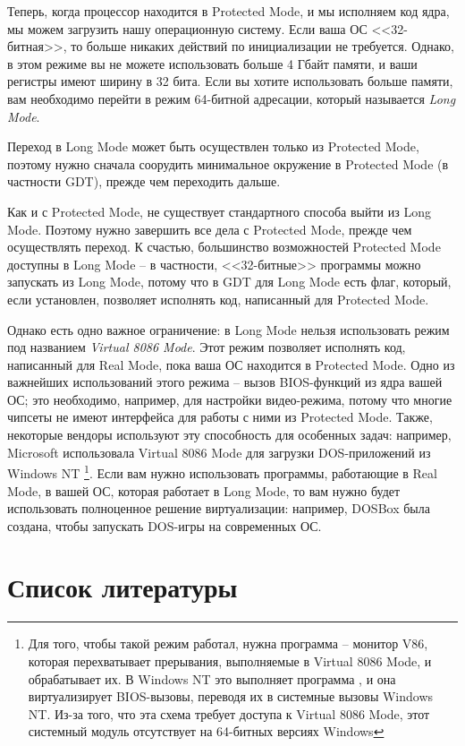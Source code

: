 \documentclass[a4page]{article}
\begin{document}
Теперь, когда процессор находится в Protected Mode,
и мы исполняем код ядра,
мы можем загрузить нашу операционную систему.
Если ваша ОС <<32-битная>>, то больше никаких действий по инициализации не требуется.
Однако, в этом режиме вы не можете использовать больше 4 Гбайт памяти,
и ваши регистры имеют ширину в 32 бита.
Если вы хотите использовать больше памяти,
вам необходимо перейти в режим 64-битной адресации, который называется \emph{Long Mode}.

Переход в Long Mode может быть осуществлен только из Protected Mode,
поэтому нужно сначала соорудить минимальное окружение в Protected Mode
(в частности GDT), прежде чем переходить дальше.

Как и с Protected Mode, не существует стандартного способа выйти из Long Mode.
Поэтому нужно завершить все дела с Protected Mode, прежде чем осуществлять переход.
К счастью, большинство возможностей Protected Mode доступны в Long Mode -- 
в частности, <<32-битные>> программы можно запускать из Long Mode,
потому что в GDT для Long Mode есть флаг, который, если установлен,
позволяет исполнять код, написанный для Protected Mode.

Однако есть одно важное ограничение: в Long Mode нельзя использовать
режим под названием \emph{Virtual 8086 Mode}.
Этот режим позволяет исполнять код, написанный для Real Mode,
пока ваша ОС находится в Protected Mode.
Одно из важнейших использований этого режима -- вызов BIOS-функций из ядра вашей ОС;
это необходимо, например, для настройки видео-режима,
потому что многие чипсеты не имеют интерфейса для работы с ними из Protected Mode.
Также, некоторые вендоры используют эту способность для особенных задач:
например, Microsoft использовала Virtual 8086 Mode для загрузки DOS-приложений
из Windows NT
\footnote{Для того, чтобы такой режим работал, нужна программа -- монитор V86,
которая перехватывает прерывания, выполняемые в Virtual 8086 Mode,
и обрабатывает их.
В Windows NT это выполняет программа ,
и она виртуализирует BIOS-вызовы, переводя их в системные вызовы Windows NT.
Из-за того, что эта схема требует доступа к Virtual 8086 Mode,
этот системный модуль отсутствует на 64-битных версиях Windows}.
Если вам нужно использовать программы, работающие в Real Mode,
в вашей ОС, которая работает в Long Mode, то вам нужно будет использовать
полноценное решение виртуализации: например, DOSBox была создана, чтобы
запускать DOS-игры на современных ОС.

\section{Список литературы}

\printbibliography
\end{document}
